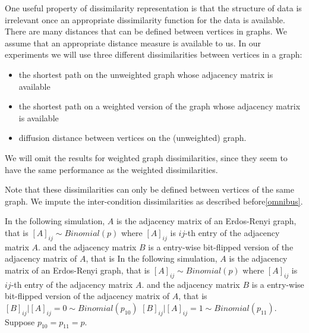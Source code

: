 \documentclass[11pt]{article} %
\begin{document}
One useful property of dissimilarity representation is that the structure of data is irrelevant once an appropriate dissimilarity function  for the data is available. 
There are many distances that can be defined between vertices in graphs. We assume that an appropriate distance measure is available to us.
In our experiments we will use three different dissimilarities between vertices in a graph:
\begin{itemize}
 \item the shortest path on the  unweighted graph whose adjacency matrix is available
 \item the shortest path on a weighted version of the graph whose adjacency matrix is available
 \item diffusion distance between vertices on the (unweighted) graph.
 \end{itemize}
 We will omit the results for weighted graph dissimilarities, since they seem to have the same performance as the weighted dissimilarities.
 
 Note that these dissimilarities can only be defined between vertices of the same graph. We impute the inter-condition dissimilarities   as described before\ref{omnibus}.
 
  In the following simulation, $A$ is the adjacency matrix of an Erdos-Renyi graph, that is
  $\left[A\right]_{ij} \sim Binomial(p)$ where $\left[A\right]_{ij}$ is $ij$-th entry of the adjacency matrix  $A$.
   and the adjacency matrix  $B$ is a entry-wise bit-flipped version of the adjacency matrix of $A$, that is
   In the following simulation, $A$ is the adjacency matrix of an Erdos-Renyi graph, that is
  $\left[A\right]_{ij} \sim Binomial(p)$ where $\left[A\right]_{ij}$ is $ij$-th entry of the adjacency matrix  $A$.
   and the adjacency matrix  $B$ is a entry-wise bit-flipped version of the adjacency matrix of $A$, that is
   $\left[B\right]_{ij}|\left[A\right]_{ij}=0 \sim Binomial(p_{10})$ $\left[B\right]_{ij}|\left[A\right]_{ij}=1 \sim Binomial(p_{11})$. Suppose $p_{10}=p_{11}=p$.
  
\end{document}
